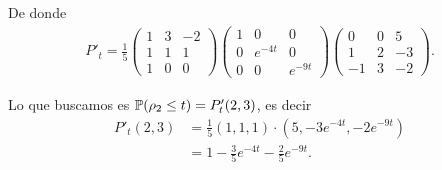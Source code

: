 De donde
\begin{align}
    P'_t  = \frac{1}{5}
            \begin{pmatrix}
                1   & 3  &   -2 \\
                1   & 1  &   1  \\
                1   & 0  &   0
            \end{pmatrix}
            \begin{pmatrix}
                1   & 0          &   0           \\
                0   & e^{-4t}    &   0           \\
                0   & 0          &   e^{-9t} 
            \end{pmatrix}        
            \begin{pmatrix}
                0   & 0  &   5   \\
                1   & 2  &   -3  \\
                -1  & 3  &   -2
            \end{pmatrix}.
\end{align}

Lo que buscamos es $\P(\rho_2 \leq t) = P'_t(2, 3)$, es decir
\begin{align}
    P'_t(2, 3)   &=  \frac{1}{5} (1,1,1)\cdot(5, -3e^{-4t}, -2e^{-9t})           \\
                &=  1 - \frac{3}{5}e^{-4t} - \frac{2}{5} e^{-9t}.
\end{align}
